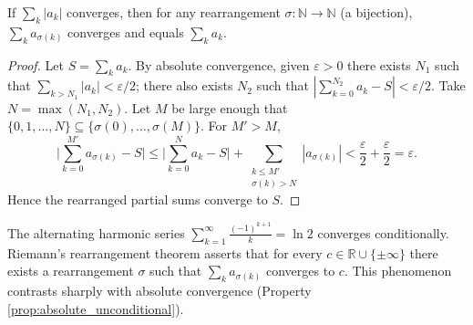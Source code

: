 \begin{property}\label{prop:absolute_unconditional}
If $\sum_k |a_k|$ converges, then for any rearrangement $\sigma: \mathbb{N} \to \mathbb{N}$ (a bijection), $\sum_k a_{\sigma(k)}$ converges and equals $\sum_k a_k$.
\end{property}

\begin{proof}
Let $S = \sum_k a_k$. By absolute convergence, given $\varepsilon > 0$ there exists $N_1$ such that $\sum_{k > N_1} |a_k| < \varepsilon/2$; there also exists $N_2$ such that $|\sum_{k=0}^{N_2} a_k - S| < \varepsilon/2$. Take $N = \max(N_1, N_2)$. Let $M$ be large enough that $\{0, 1, \dots, N\} \subseteq \{\sigma(0), \dots, \sigma(M)\}$. For $M' > M$,
\[
\Big| \sum_{k=0}^{M'} a_{\sigma(k)} - S \Big| \le \Big| \sum_{k=0}^{N} a_k - S \Big| + \sum_{\substack{k \le M' \\ \sigma(k) > N}} |a_{\sigma(k)}| < \frac{\varepsilon}{2} + \frac{\varepsilon}{2} = \varepsilon.
\]
Hence the rearranged partial sums converge to $S$.
\end{proof}

\begin{example}\label{ex:riemann_rearrangement}
The alternating harmonic series $\sum_{k=1}^{\infty} \frac{(-1)^{k+1}}{k} = \ln 2$ converges conditionally. Riemann's rearrangement theorem asserts that for every $c \in \mathbb{R} \cup \{\pm\infty\}$ there exists a rearrangement $\sigma$ such that $\sum_k a_{\sigma(k)}$ converges to $c$. This phenomenon contrasts sharply with absolute convergence (Property \ref{prop:absolute_unconditional}).
\end{example}

